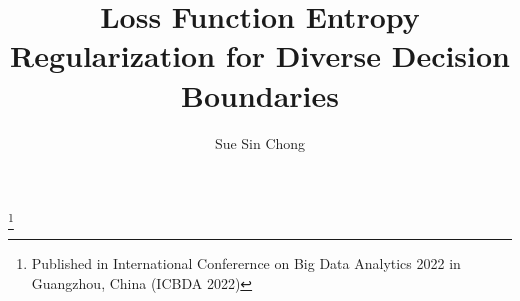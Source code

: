\documentclass[journal]{journal}
\begin{document}
%
\title{Loss Function Entropy Regularization for Diverse Decision Boundaries}
%
%
%

\author{Sue Sin Chong}
\thanks{Published in International Conferernce on Big Data Analytics 2022 in Guangzhou, China (ICBDA 2022)}%


% 
%



% 




\end{document}
